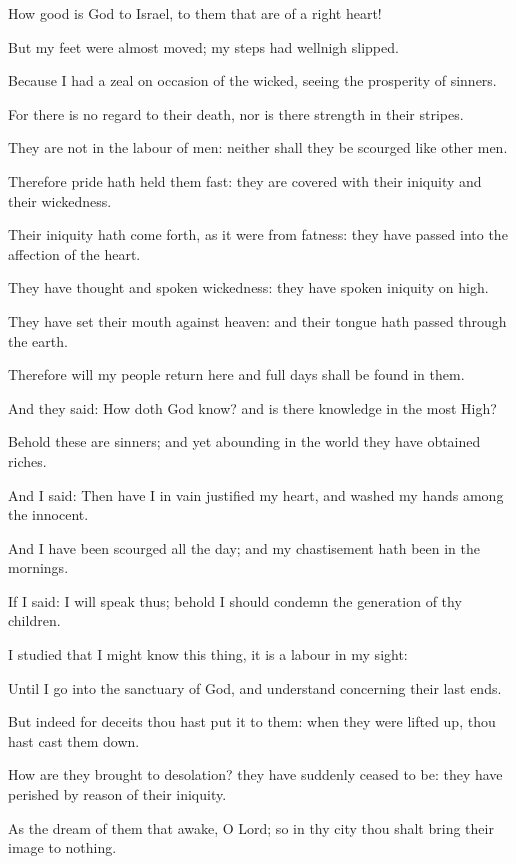 ﻿\item How good is God to Israel, to them that are of a right heart!
\item But my feet were almost moved; my steps had wellnigh slipped.
\item Because I had a zeal on occasion of the wicked, seeing the prosperity of sinners.
\item For there is no regard to their death, nor is there strength in their stripes.
\item They are not in the labour of men: neither shall they be scourged like other men.
\item Therefore pride hath held them fast: they are covered with their iniquity and their wickedness.
\item Their iniquity hath come forth, as it were from fatness: they have passed into the affection of the heart.
\item They have thought and spoken wickedness: they have spoken iniquity on high.
\item They have set their mouth against heaven: and their tongue hath passed through the earth.
\item Therefore will my people return here and full days shall be found in them.
\item And they said: How doth God know? and is there knowledge in the most High?
\item Behold these are sinners; and yet abounding in the world they have obtained riches.
\item And I said: Then have I in vain justified my heart, and washed my hands among the innocent.
\item And I have been scourged all the day; and my chastisement hath been in the mornings.
\item If I said: I will speak thus; behold I should condemn the generation of thy children.
\item I studied that I might know this thing, it is a labour in my sight:
\item Until I go into the sanctuary of God, and understand concerning their last ends.
\item But indeed for deceits thou hast put it to them: when they were lifted up, thou hast cast them down.
\item How are they brought to desolation? they have suddenly ceased to be: they have perished by reason of their iniquity.
\item As the dream of them that awake, O Lord; so in thy city thou shalt bring their image to nothing.
